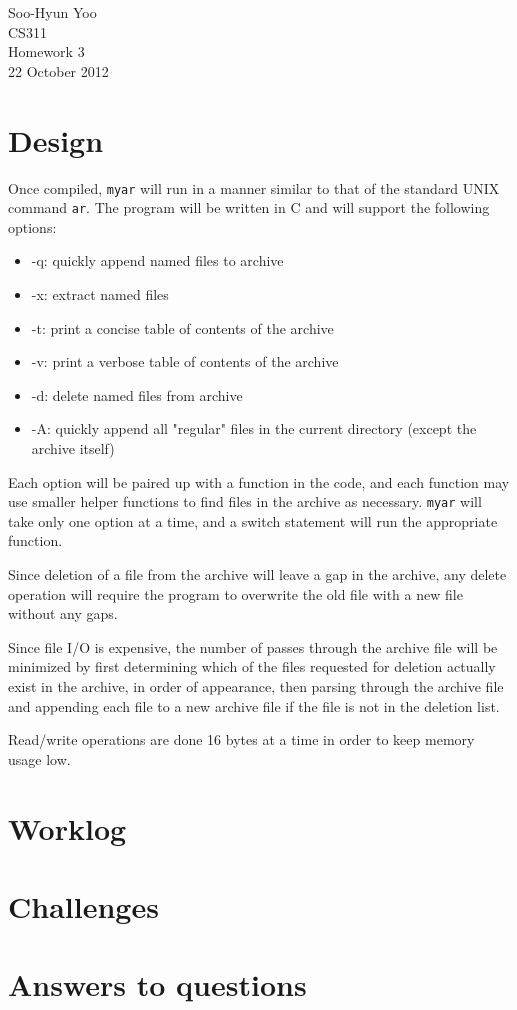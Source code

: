 \documentclass[12pt,letterpaper]{article}
\begin{document}
Soo-Hyun Yoo \\
CS311 \\
Homework 3 \\
22 October 2012


\section*{Design}

Once compiled, {\tt myar} will run in a manner similar to that of the standard
UNIX command {\tt ar}. The program will be written in C and will support the
following options:

\begin{itemize}
	\item -q: quickly append named files to archive
	\item -x: extract named files
	\item -t: print a concise table of contents of the archive
	\item -v: print a verbose table of contents of the archive
	\item -d: delete named files from archive
	\item -A: quickly append all "regular" files in the current directory
		(except the archive itself)
\end{itemize}

Each option will be paired up with a function in the code, and each function
may use smaller helper functions to find files in the archive as necessary.
{\tt myar} will take only one option at a time, and a switch statement will run
the appropriate function.

Since deletion of a file from the archive will leave a gap in the archive, any
delete operation will require the program to overwrite the old file with a new
file without any gaps.

Since file I/O is expensive, the number of passes through the archive file will
be minimized by first determining which of the files requested for deletion
actually exist in the archive, in order of appearance, then parsing through the
archive file and appending each file to a new archive file if the file is not
in the deletion list.

Read/write operations are done 16 bytes at a time in order to keep memory usage
low.


\section*{Worklog}


\section*{Challenges}


\section*{Answers to questions}
\end{document}
